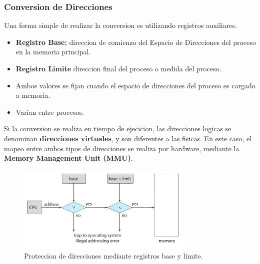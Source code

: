 \subsubsection{Conversion de Direcciones}
Una forma simple de realizar la conversion es utilizando registros auxiliares.
\begin{itemize}
    \item \textbf{Registro Base:} direccion de comienzo del Espacio de Direcciones del proceso en la memoria principal.
    \item \textbf{Registro Limite} direccion final del proceso o medida del proceso.
    \item Ambos valores se fijan cuando el espacio de direcciones del proceso es cargado a memoria.
    \item Varian entre procesos.
\end{itemize}
    Si la conversion se realiza en tiempo de ejecicion, las direcciones logicas se denominan \textbf{direcciones virtuales}, y son diferentes a las fisicas.
En este caso, el mapeo entre ambos tipos de direcciones se realiza por hardware, mediante la \textbf{Memory Management Unit (MMU)}.
\begin{figure}
    \begin{center}
        \includegraphics[width=0.75\textwidth]{assets/ConversionDirecciones.pdf}
    \end{center}
    \caption{Proteccion de direcciones mediante registros base y limite.}\label{fig:69}
\end{figure}

